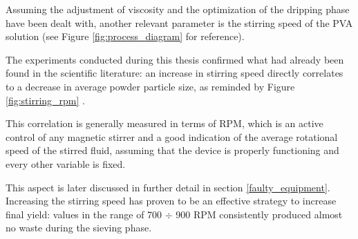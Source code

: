 \documentclass[a4paper]{article}
\begin{document}

        Assuming the adjustment of viscosity and the optimization of the dripping phase have been dealt with, 
        another relevant parameter is the stirring speed of the PVA solution (see Figure \ref{fig:process_diagram} for reference). 

        The experiments conducted during this thesis confirmed what had already been found in the scientific literature: 
        an increase in stirring speed directly correlates to a decrease in average powder particle size, as reminded by Figure \ref{fig:stirring_rpm}
        \autocites{DechetMaximilianA2020OtDo}. 

        This correlation is generally measured in terms of RPM, which is an active control of any magnetic stirrer and 
        a good indication of the average rotational speed of the stirred fluid, assuming that the device is properly functioning
        and every other variable is fixed. 
        
%
%
%
%
        This aspect is later discussed in further detail in section \ref{faulty_equipment}. \\ 

        Increasing the stirring speed has proven to be an effective 
        strategy to increase final yield: values in the range of 700 $\div $ 900 RPM consistently produced almost no waste during the sieving phase. 
\end{document}
